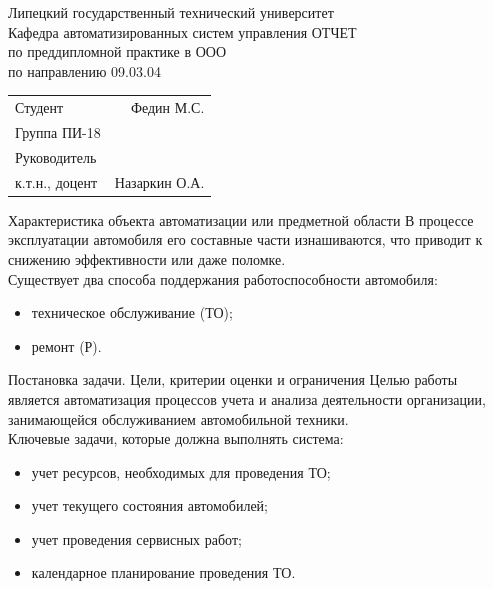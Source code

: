 \documentclass{beamer}
\begin{document}
\begin{frame}
    \begin{center}
        Липецкий государственный технический университет\\
        Кафедра автоматизированных систем управления
        \vfill
        ОТЧЕТ\\
        по преддипломной практике в ООО \\
        по направлению 09.03.04 \\
    \end{center}
    \vfill
    \begin{tabularx}{\textwidth}{LR}
        Студент & Федин М.С. \\
        Группа ПИ-18 & \\
        Руководитель & \\
        к.т.н., доцент & Назаркин О.А.
    \end{tabularx}
\end{frame}

\begin{frame}
    {Характеристика объекта автоматизации или предметной области}
    В процессе эксплуатации автомобиля его составные части изнашиваются, что
    приводит к снижению эффективности или даже поломке.
    \\[\baselineskip]

    Существует два способа поддержания работоспособности автомобиля:
    \begin{itemize}
        \item техническое обслуживание (ТО);
        \item ремонт (Р).
    \end{itemize}
\end{frame}

\begin{frame}
	{Постановка задачи. Цели, критерии оценки и ограничения}
    Целью работы является автоматизация процессов учета и
    анализа деятельности организации, занимающейся обслуживанием
    автомобильной техники.
    \\[\baselineskip]

    Ключевые задачи, которые должна выполнять система:
    \begin{itemize}
        \item учет ресурсов, необходимых для проведения ТО;
        \item учет текущего состояния автомобилей;
        \item учет проведения сервисных работ;
        \item календарное планирование проведения ТО.
    \end{itemize}
\end{frame}
\end{document}
